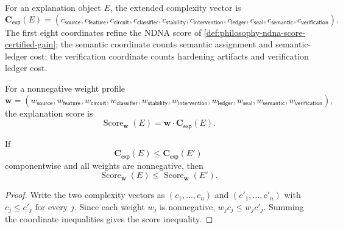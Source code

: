 \begin{definition}
\label{def:philosophy-extended-explanation-complexity-vector}
For an explanation object $E$, the extended complexity vector is
$$
\mathbf C_{\mathsf{exp}}(E)
=
(
c_{\mathsf{source}},
c_{\mathsf{feature}},
c_{\mathsf{circuit}},
c_{\mathsf{classifier}},
c_{\mathsf{stability}},
c_{\mathsf{intervention}},
c_{\mathsf{ledger}},
c_{\mathsf{seal}},
c_{\mathsf{semantic}},
c_{\mathsf{verification}}
).
$$
The first eight coordinates refine the NDNA score of
\autoref{def:philosophy-ndna-score-certified-gain}; the semantic
coordinate counts semantic assignment and semantic-ledger cost; the
verification coordinate counts hardening artifacts and verification
ledger cost.
\end{definition}

\begin{definition}
\label{def:philosophy-explanation-score}
For a nonnegative weight profile
$$
\mathbf w=
(
w_{\mathsf{source}},
w_{\mathsf{feature}},
w_{\mathsf{circuit}},
w_{\mathsf{classifier}},
w_{\mathsf{stability}},
w_{\mathsf{intervention}},
w_{\mathsf{ledger}},
w_{\mathsf{seal}},
w_{\mathsf{semantic}},
w_{\mathsf{verification}}
),
$$
the explanation score is
$$
\operatorname{Score}_{\mathbf w}(E)
=
\mathbf w\cdot\mathbf C_{\mathsf{exp}}(E).
$$
\end{definition}

\begin{theorem}
\label{thm:philosophy-explanation-score-monotone}
If
$$
\mathbf C_{\mathsf{exp}}(E)\leq
\mathbf C_{\mathsf{exp}}(E')
$$
componentwise and all weights are nonnegative, then
$$
\operatorname{Score}_{\mathbf w}(E)
\leq
\operatorname{Score}_{\mathbf w}(E').
$$
\end{theorem}
\begin{proof}
Write the two complexity vectors as $(c_1,\ldots,c_n)$ and
$(c'_1,\ldots,c'_n)$ with $c_j\leq c'_j$ for every $j$. Since each
weight $w_j$ is nonnegative, $w_jc_j\leq w_jc'_j$. Summing the
coordinate inequalities gives the score inequality.
\end{proof}



